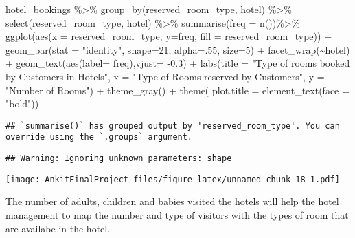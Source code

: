 \documentclass[
]{article}
\newenvironment{Shaded}{\begin{snugshade}}{\end{snugshade}}
\newcommand{\AttributeTok}[1]{\textcolor[rgb]{0.77,0.63,0.00}{#1}}
\newcommand{\DecValTok}[1]{\textcolor[rgb]{0.00,0.00,0.81}{#1}}
\newcommand{\FloatTok}[1]{\textcolor[rgb]{0.00,0.00,0.81}{#1}}
\newcommand{\FunctionTok}[1]{\textcolor[rgb]{0.00,0.00,0.00}{#1}}
\newcommand{\NormalTok}[1]{#1}
\newcommand{\SpecialCharTok}[1]{\textcolor[rgb]{0.00,0.00,0.00}{#1}}
\newcommand{\StringTok}[1]{\textcolor[rgb]{0.31,0.60,0.02}{#1}}
\begin{document}
\begin{Shaded}
\begin{Highlighting}[]
\NormalTok{hotel\_bookings }\SpecialCharTok{\%\textgreater{}\%} \FunctionTok{group\_by}\NormalTok{(reserved\_room\_type, hotel) }\SpecialCharTok{\%\textgreater{}\%} 
  \FunctionTok{select}\NormalTok{(reserved\_room\_type, hotel) }\SpecialCharTok{\%\textgreater{}\%} \FunctionTok{summarise}\NormalTok{(}\AttributeTok{freq =} \FunctionTok{n}\NormalTok{())}\SpecialCharTok{\%\textgreater{}\%} \FunctionTok{ggplot}\NormalTok{(}\FunctionTok{aes}\NormalTok{(}\AttributeTok{x =}\NormalTok{ reserved\_room\_type, }\AttributeTok{y=}\NormalTok{freq, }\AttributeTok{fill =}\NormalTok{ reserved\_room\_type)) }\SpecialCharTok{+}
  \FunctionTok{geom\_bar}\NormalTok{(}\AttributeTok{stat =} \StringTok{"identity"}\NormalTok{, }\AttributeTok{shape=}\DecValTok{21}\NormalTok{, }\AttributeTok{alpha=}\NormalTok{.}\DecValTok{55}\NormalTok{, }\AttributeTok{size=}\DecValTok{5}\NormalTok{) }\SpecialCharTok{+} \FunctionTok{facet\_wrap}\NormalTok{(}\SpecialCharTok{\textasciitilde{}}\NormalTok{hotel) }\SpecialCharTok{+} 
  \FunctionTok{geom\_text}\NormalTok{(}\FunctionTok{aes}\NormalTok{(}\AttributeTok{label=}\NormalTok{ freq),}\AttributeTok{vjust=} \SpecialCharTok{{-}}\FloatTok{0.3}\NormalTok{) }\SpecialCharTok{+}
  \FunctionTok{labs}\NormalTok{(}\AttributeTok{title =} \StringTok{"Type of rooms booked by Customers in Hotels"}\NormalTok{, }\AttributeTok{x =} \StringTok{"Type of Rooms reserved by Customers"}\NormalTok{, }\AttributeTok{y =} \StringTok{"Number of Rooms"}\NormalTok{) }\SpecialCharTok{+}
  \FunctionTok{theme\_gray}\NormalTok{() }\SpecialCharTok{+}
  \FunctionTok{theme}\NormalTok{( }\AttributeTok{plot.title =} \FunctionTok{element\_text}\NormalTok{(}\AttributeTok{face =} \StringTok{"bold"}\NormalTok{))}
\end{Highlighting}
\end{Shaded}

\begin{verbatim}
## `summarise()` has grouped output by 'reserved_room_type'. You can override using the `.groups` argument.
\end{verbatim}

\begin{verbatim}
## Warning: Ignoring unknown parameters: shape
\end{verbatim}

\texttt{[image: AnkitFinalProject\_files/figure-latex/unnamed-chunk-18-1.pdf]}

The number of adults, children and babies visited the hotels will help
the hotel management to map the number and type of visitors with the
types of room that are availabe in the hotel.
\end{document}
